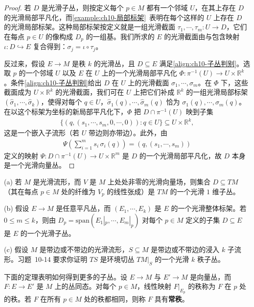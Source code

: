\documentclass[../../main.tex]{subfiles}
\begin{document}
\begin{proof}
若 $D$ 是光滑子丛，则按定义每个 $p\in M$ 都有一个邻域 $U$，在其上存在 $D$ 的光滑局部平凡化，而\cref{example:ch10-局部标架}~表明在每个这样的 $U$ 上存在 $D$ 的光滑局部标架。这种局部标架按定义就是一组光滑截面 $\tau_1,\cdots ,\tau_m\colon U\to D$，它们在每点 $p\in U$ 的像构成 $D_p$ 的一组基。我们所求的 $E$ 的光滑截面由与包含映射 $\iota\colon D\hookrightarrow E$ 复合得到：$\sigma_j=\iota\circ\tau_j$。

反过来，假设 $E\to M$ 是秩 $k$ 的光滑丛，且 $D\subseteq E$ 满足\eqref{align:ch10-子丛判别}。选取 $p$ 的一个邻域 $U$ 以及 $E$ 在 $U$ 上的一个光滑局部平凡化 $\Phi\colon\pi^{-1}(U)\to U\times\mathbb{R}^k$。条件\eqref{align:ch10-子丛判别}给出 $D$ 在 $U$ 上的光滑截面 $\sigma_1,\cdots ,\sigma_m$。在 $\Phi$ 下，这些截面成为 $U\times\mathbb{R}^k$ 的光滑截面，我们可在 $U$ 上把它们补成 $\mathbb{R}^k$ 的一组光滑局部标架 $(\widehat\sigma_1,\cdots ,\widehat\sigma_k)$，使得对每个 $q\in U$，$\widehat\sigma_1(q),\cdots ,\widehat\sigma_m(q)$ 恰为 $\sigma_1(q),\cdots ,\sigma_m(q)$。在以这个标架为坐标的新局部平凡化下，$\Phi$ 把 $D\cap\pi^{-1}(U)$ 映到子集
\begin{align*}
\big\{(q,(s_1,\cdots ,s_m,0,\cdots ,0)):q\in U\big\}\subseteq U\times\mathbb{R}^k,
\end{align*}
这是一个嵌入子流形（若 $U$ 带边则亦带边）。此外，由
\begin{align*}
\Psi\left(\sum_{i=1}^m s_i\,\sigma_i(q)\right)=(q,(s_1,\cdots ,s_m))
\end{align*}
定义的映射 $\Psi\colon D\cap\pi^{-1}(U)\to U\times\mathbb{R}^m$ 是 $D$ 的一个光滑局部平凡化，故 $D$ 本身是一个光滑向量丛。
\end{proof}

\begin{example}[子丛]\label{example:ch10-子丛例子}
(a) 若 $M$ 是光滑流形，而 $V$ 是 $M$ 上处处非零的光滑向量场，则集合 $D\subseteq TM$（其在每点 $p\in M$ 处的纤维为 $V_p$ 的线性张成）是 $TM$ 的一个光滑 $1$ 维子丛。

(b) 假设 $E\to M$ 是任意平凡丛，而 $(E_1,\cdots ,E_k)$ 是 $E$ 的一个光滑整体标架。若 $0\leqslant m\leqslant k$，则由 $D_p=\mathrm{span}(E_1|_p,\cdots ,E_m|_p)$ 对每个 $p\in M$ 定义的子集 $D\subseteq E$ 是 $E$ 的一个光滑子丛。

(c) 假设 $M$ 是带边或不带边的光滑流形，$S\subseteq M$ 是带边或不带边的浸入 $k$ 子流形。习题~10-14 要求你证明 $TS$ 是环境切丛 $TM|_S$ 的一个光滑 $k$ 秩子丛。
\end{example}

下面的定理表明如何得到更多的子丛。设 $E\to M$ 与 $E'\to M$ 是向量丛，而 $F\colon E\to E'$ 是 $M$ 上的丛同态。对每个 $p\in M$，线性映射 $F|_{E_p}$ 的秩称为 $F$ 在 $p$ 处的秩。若 $F$ 在所有 $p\in M$ 处的秩都相同，则称 $F$ 具有\textbf{常秩}。
\end{document}

